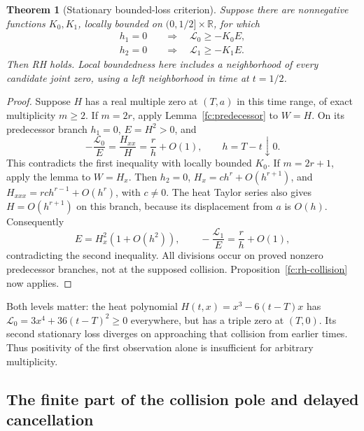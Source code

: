 \documentclass[11pt]{article}
\numberwithin{equation}{section}
\newtheorem{theorem}{Theorem}[section]
\theoremstyle{definition}
\theoremstyle{remark}
\newcommand{\R}{\mathbb R}
\newcommand{\C}{\mathbb C}
\newcommand{\HH}{\mathbb H}
\newcommand{\OO}{\mathbb O}
\newcommand{\ii}{\mathbf i}
\newcommand{\jj}{\mathbf j}
\newcommand{\kk}{\mathbf k}
\begin{document}
\begin{theorem}[Stationary bounded-loss criterion]
\label{fc:bounded-loss}
Suppose there are nonnegative functions $K_0,K_1$, locally bounded
on $(0,1/2]\times\R$, for which
\begin{equation}
 \begin{split}
 h_1=0&\quad\Longrightarrow\quad\mathcal L_0\ge-K_0E,\\
 h_2=0&\quad\Longrightarrow\quad\mathcal L_1\ge-K_1E.
 \end{split}
 \label{fc:stationary-loss}
\end{equation}
Then RH holds.  Local boundedness here includes a neighborhood of
every candidate joint zero, using a left neighborhood in time at
$t=1/2$.
\end{theorem}
\begin{proof}
Suppose $H$ has a real multiple zero at $(T,a)$ in this time range,
of exact multiplicity $m\ge2$.
If $m=2r$, apply Lemma~\ref{fc:predecessor} to $W=H$.
On its predecessor branch $h_1=0$, $E=H^2>0$, and
\[
 -\frac{\mathcal L_0}{E}=\frac{H_{xx}}H
 =\frac rh+O(1),\qquad h=T-t\downarrow0.
\]
This contradicts the first inequality with locally bounded $K_0$.
If $m=2r+1$, apply the lemma to $W=H_x$.
Then $h_2=0$, $H_x=c h^r+O(h^{r+1})$, and
$H_{xxx}=rc h^{r-1}+O(h^r)$, with $c\ne0$.
The heat Taylor series also gives $H=O(h^{r+1})$ on this branch,
because its displacement from $a$ is $O(h)$.  Consequently
\[
 E=H_x^2(1+O(h^2)),\qquad
 -\frac{\mathcal L_1}{E}=\frac rh+O(1),
\]
contradicting the second inequality.  All divisions occur on proved
nonzero predecessor branches, not at the supposed collision.
Proposition~\ref{fc:rh-collision} now applies.
\end{proof}

Both levels matter: the heat polynomial
$H(t,x)=x^3-6(t-T)x$ has
$\mathcal L_0=3x^4+36(t-T)^2\ge0$ everywhere, but has a triple zero
at $(T,0)$.  Its second stationary loss diverges on approaching that
collision from earlier times.  Thus positivity of the first observation
alone is insufficient for arbitrary multiplicity.




\subsection{The finite part of the collision pole and delayed cancellation}
\label{subsec:collision-finite-part}
\end{document}
